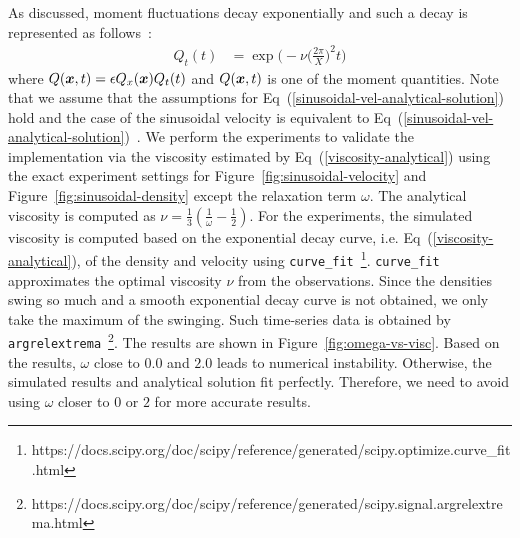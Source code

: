 As discussed, moment fluctuations decay exponentially and
such a decay is represented as follows~\cite{palmer1994transverse, hess2002determining}:
\begin{equation}
  \begin{aligned}
    Q_t(t) &= \exp\biggl(
      -\nu \biggl(
        \frac{2\pi}{X}
      \biggr)^2 t\biggr)
  \end{aligned}
  \label{viscosity-analytical}
\end{equation}
where $Q(\boldsymbol{x}, t) = \epsilon Q_x(\boldsymbol{x}) Q_t(t)$
and $Q(\boldsymbol{x}, t)$ is one of the moment quantities.
Note that we assume that the assumptions for Eq~(\ref{sinusoidal-vel-analytical-solution}) hold
and the case of the sinusoidal velocity is equivalent to Eq~(\ref{sinusoidal-vel-analytical-solution})~\cite{fei2018three}.
We perform the experiments to validate the implementation via the viscosity estimated by Eq~(\ref{viscosity-analytical}) using
the exact experiment settings for Figure~\ref{fig:sinusoidal-velocity}
and Figure~\ref{fig:sinusoidal-density}
except the relaxation term $\omega$.
The analytical viscosity is computed as $\nu = \frac{1}{3} (\frac{1}{\omega} - \frac{1}{2})$.
For the experiments, the simulated viscosity is computed based on the exponential decay curve, i.e. Eq~(\ref{viscosity-analytical}),
of the density and velocity using 
{\tt curve\_fit}~\footnote{https://docs.scipy.org/doc/scipy/reference/generated/scipy.optimize.curve\_fit.html}.
{\tt curve\_fit} approximates the optimal viscosity $\nu$ from the observations.
Since the densities swing so much and a smooth exponential decay curve
is not obtained, we only take the maximum of the swinging.
Such time-series data is obtained by
{\tt argrelextrema}~\footnote{https://docs.scipy.org/doc/scipy/reference/generated/scipy.signal.argrelextrema.html}.
The results are shown in Figure~\ref{fig:omega-vs-visc}.
Based on the results, $\omega$ close to $0.0$ and $2.0$
leads to numerical instability.
Otherwise, the simulated results and analytical solution fit perfectly.
Therefore, we need to avoid using $\omega$ closer to $0$ or $2$ for more accurate results.


